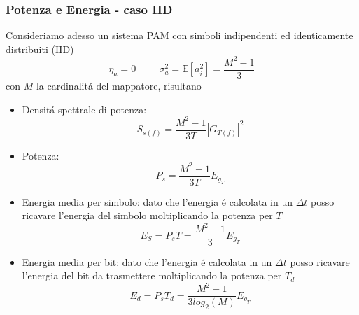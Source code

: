         \subsubsection{Potenza e Energia - caso IID}
            Consideriamo adesso un sistema PAM con simboli indipendenti ed identicamente distribuiti (IID)
            \[
                \eta_a = 0 \hspace{1cm} \sigma_a^2 = \mathbb{E}[a_i^2] = \frac{M^2-1}{3}    
            \]
            con $M$ la cardinalitá del mappatore, risultano 
            \begin{itemize}
                \item {Densitá spettrale di potenza:
                    \[
                        S_{s(f)} = \frac{M^2-1}{3T}\left|G_{T(f)}\right|^2
                    \]
                }
                \item {Potenza:
                    \[
                        P_s = \frac{M^2-1}{3T}E_{g_T}
                    \]
                }
                \item {Energia media per simbolo: dato che l'energia é calcolata in un $\Delta t$ posso ricavare l'energia del simbolo moltiplicando la potenza per $T$
                    \[
                        E_S = P_sT = \frac{M^2-1}{3}E_{g_T}
                    \]
                }
                \item {Energia media per bit: dato che l'energia é calcolata in un $\Delta t$ posso ricavare l'energia del bit da trasmettere
                moltiplicando la potenza per $T_d$
                    \[
                        E_d = P_sT_d = \frac{M^2-1}{3log_2(M)}E_{g_T}
                    \]
                }
            \end{itemize}
